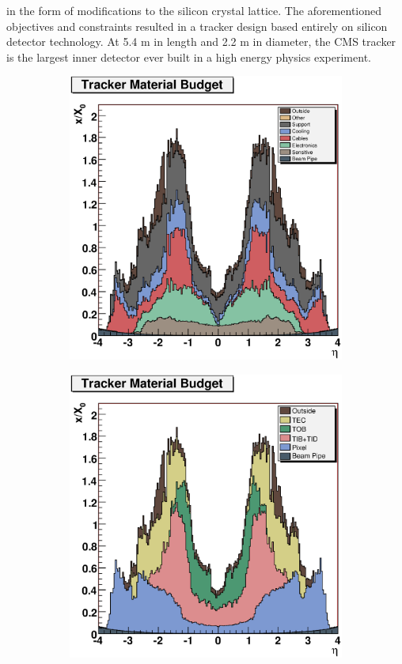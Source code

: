 in the form of modifications to the silicon crystal lattice. 
The aforementioned objectives and constraints resulted in a tracker design 
based entirely on silicon detector technology. 
At 5.4 m in length and 2.2 m in diameter, the CMS tracker is the largest inner
detector ever built in a high energy physics experiment.
\begin{figure}[hb]
  \centering
  \begin{subfigure}{.5\textwidth}
	\includegraphics[width=\textwidth]{images/Tracker_Materials_x_vs_eta.eps} 
	\end{subfigure}	
   \begin{subfigure}{.5\textwidth}
	\includegraphics[width=\textwidth]{images/Tracker_SubDetectors_x_vs_eta.eps}

\end{subfigure}
\end{figure}

